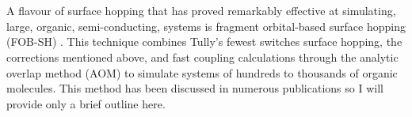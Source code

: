 \\\\
A flavour of surface hopping that has proved remarkably effective at simulating, large, organic, semi-conducting, systems is fragment orbital-based surface hopping (FOB-SH) \cite{FOB-SH_Spencer}. This technique combines Tully's fewest switches surface hopping, the corrections mentioned above, and fast coupling calculations through the analytic overlap method (AOM) \cite{gajdos_ultrafast_2014} to simulate systems of hundreds to thousands of organic molecules. This method has been discussed in numerous publications \cite{Giannini2018Crossover, Carof2017FSSH, Giannini2019, C9FD00046A, C9CP04770K, C9TC05270D, FlickPolarons, FOB-SH_Spencer, C6FD00107F} so I will provide only a brief outline here.
\\\\
